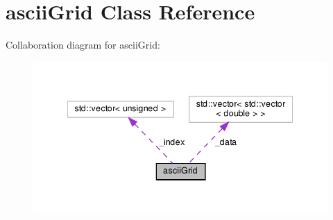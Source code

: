 \hypertarget{classasciiGrid}{}\section{ascii\+Grid Class Reference}
\label{classasciiGrid}


Collaboration diagram for ascii\+Grid\+:
\nopagebreak
\begin{figure}[H]
\begin{center}
\leavevmode
\includegraphics[width=342pt]{classasciiGrid__coll__graph}
\end{center}
\end{figure}
